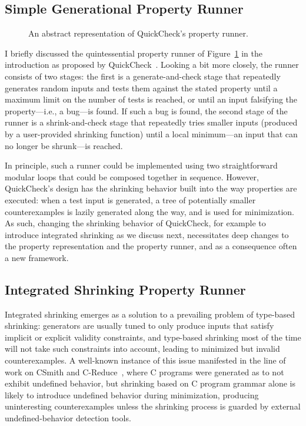 

\subsection{Simple Generational Property Runner}\label{sec:loops:sgpr}

\begin{figure}[h]
  \centering
  \resizebox{0.95\linewidth}{!}{}
  \caption{An abstract representation of QuickCheck's property runner.}
  \label{fig:quickchick-property-runner-loops}
\end{figure}

I briefly discussed the quintessential property runner of
Figure~\ref{fig:quickchick-property-runner-loops} in the introduction as proposed by
QuickCheck~\cite{ClaessenH00}. Looking a bit more closely, the runner consists of two
stages: the first is a generate-and-check stage that repeatedly generates random inputs
and tests them against the stated property until a maximum limit on the number of tests
is reached, or until an input falsifying the property---i.e., a bug---is found. If such
a bug is found, the second stage of the runner is a shrink-and-check stage that
repeatedly tries smaller inputs (produced by a user-provided shrinking function) until
a local minimum---an input that can no longer be shrunk---is reached.

In principle, such a runner could be implemented using two straightforward modular
loops that could be composed together in sequence. However, QuickCheck's design has the
shrinking behavior built into the way properties are executed: when a test input is
generated, a tree of potentially smaller counterexamples is lazily generated along the
way, and is used for minimization. As such, changing the shrinking behavior of
QuickCheck, for example to introduce integrated shrinking as we discuss next,
necessitates deep changes to the property representation and the property runner, and
as a consequence often a new framework.

\subsection{Integrated Shrinking Property Runner}\label{sec:loops:ispr}

Integrated shrinking emerges as a solution to a prevailing problem of type-based
shrinking: generators are usually tuned to only produce inputs that satisfy implicit or
explicit validity constraints, and type-based shrinking most of the time will not take
such constraints into account, leading to minimized but invalid counterexamples. A
well-known instance of this issue manifested in the line of work on CSmith and
C-Reduce~\cite{YangCER11,RegehrCCEEY12}, where C programs were generated as to not
exhibit undefined behavior, but shrinking based on C program grammar alone is likely to
introduce undefined behavior during minimization, producing uninteresting
counterexamples unless the shrinking process is guarded by external undefined-behavior
detection tools.

